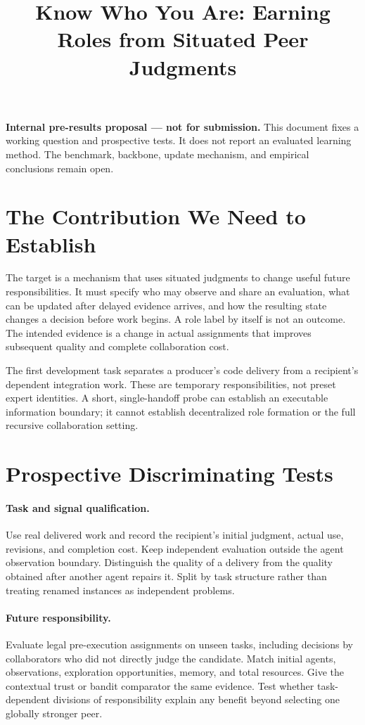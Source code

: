 \documentclass[sigconf,anonymous]{aamas}
\title[Know Who You Are]{Know Who You Are: Earning Roles from Situated Peer Judgments}
\begin{document}
\maketitle

\noindent\textbf{Internal pre-results proposal --- not for submission.}
This document fixes a working question and prospective tests. It does not
report an evaluated learning method. The benchmark, backbone, update mechanism,
and empirical conclusions remain open.

\section{The Contribution We Need to Establish}

The target is a mechanism that uses situated judgments to change useful future
responsibilities. It must specify who may observe and share an evaluation,
what can be updated after delayed evidence arrives, and how the resulting
state changes a decision before work begins. A role label by itself is not an
outcome. The intended evidence is a change in actual assignments that improves
subsequent quality and complete collaboration cost.

The first development task separates a producer's code delivery from a
recipient's dependent integration work. These are temporary responsibilities,
not preset expert identities. A short, single-handoff probe can establish an
executable information boundary; it cannot establish decentralized role
formation or the full recursive collaboration setting.

\section{Prospective Discriminating Tests}

\paragraph{Task and signal qualification.}
Use real delivered work and record the recipient's initial judgment, actual
use, revisions, and completion cost. Keep independent evaluation outside the
agent observation boundary. Distinguish the quality of a delivery from the
quality obtained after another agent repairs it. Split by task structure
rather than treating renamed instances as independent problems.

\paragraph{Future responsibility.}
Evaluate legal pre-execution assignments on unseen tasks, including decisions
by collaborators who did not directly judge the candidate. Match initial
agents, observations, exploration opportunities, memory, and total resources.
Give the contextual trust or bandit comparator the same evidence. Test whether
task-dependent divisions of responsibility explain any benefit beyond selecting
one globally stronger peer.
\end{document}
